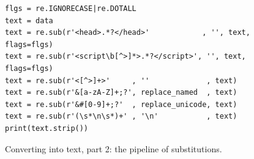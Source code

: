 \begin{figure}[!ht]
\centering
  \begin{verbatim}
flgs = re.IGNORECASE|re.DOTALL
text = data
text = re.sub(r'<head>.*?</head>'            , '', text, flags=flgs)
text = re.sub(r'<script\b[^>]*>.*?</script>', '', text, flags=flgs)
text = re.sub(r'<[^>]+>'     , ''             , text)
text = re.sub(r'&[a-zA-Z]+;?', replace_named  , text)
text = re.sub(r'&#[0-9]+;?'  , replace_unicode, text)
text = re.sub(r'(\s*\n\s*)+' , '\n'           , text)
print(text.strip())
\end{verbatim}
\vspace*{-0.3cm}
\caption{Converting  into text, part 2: the pipeline of substitutions.}
\label{fig:html2text.py-2}
\end{figure}

